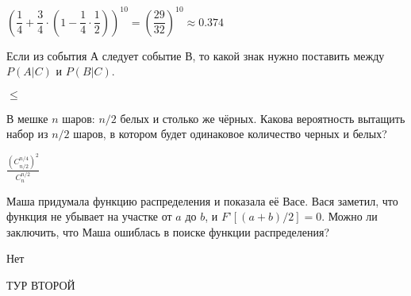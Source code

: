 \documentclass[12pt, addpoints, answers]{exam} %
\begin{document}
\begin{questions}
\begin{solution}

$\left(\dfrac14 + \dfrac34\cdot\left(1 - \dfrac{1}{4}\cdot\dfrac12\right)\right)^{10} = \left(\dfrac{29}{32}\right)^{10}\approx 0.374$
\end{solution}


\question Если из события А следует событие В, то какой знак нужно поставить между $P(A|C)$ и $P(B|C)$.
\begin{solution}
 $\leq$
\end{solution}

\question В мешке $n$ шаров: $n/2$ белых и столько же чёрных. Какова вероятность вытащить набор из $n/2$ шаров, в котором будет одинаковое количество черных и белых?

\begin{solution} $\frac{(C^{n/4}_{n/2})^2}{C_{n}^{n/2}}$
\end{solution}

\question Маша придумала функцию распределения и показала её Васе. Вася заметил, что функция не убывает на участке от $a$ до $b$, и $F’[(a+b)/2] = 0$. Можно ли заключить, что Маша ошиблась в поиске функции распределения?
\begin{solution}
 Нет
\end{solution}


\end{questions}

\newpage
\vspace{0.2in}



\begin{center}
ТУР ВТОРОЙ
\end{center}
\end{document}

